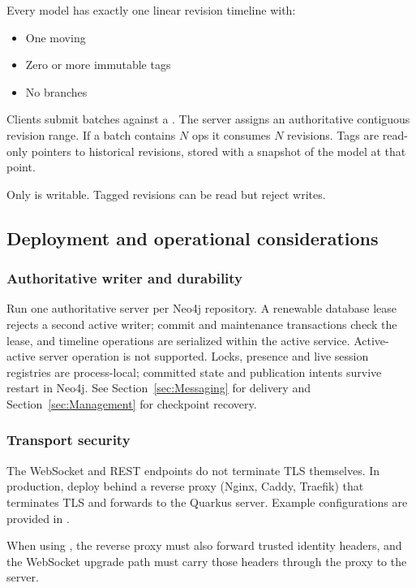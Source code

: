 Every model has exactly one linear revision timeline with:

\begin{itemize}
\item One moving 
\item Zero or more immutable tags
\item No branches
\end{itemize}

Clients submit batches against a . The server assigns an
authoritative contiguous revision range. If a batch contains \(N\) ops it
consumes \(N\) revisions. Tags are read-only pointers to historical revisions,
stored with a snapshot of the model at that point.

Only  is writable. Tagged revisions can be read but reject writes.

\subsection{Deployment and operational considerations}

\subsubsection{Authoritative writer and durability}

Run one authoritative server per Neo4j repository. A renewable database lease
rejects a second active writer; commit and maintenance transactions check the
lease, and timeline operations are serialized within the active service.
Active-active server operation is not supported. Locks, presence and live
session registries are process-local; committed state and publication intents
survive restart in Neo4j. See Section~\ref{sec:Messaging} for delivery and
Section~\ref{sec:Management} for checkpoint recovery.

\subsubsection{Transport security}

The WebSocket and REST endpoints do not terminate TLS themselves. In production,
deploy behind a reverse proxy (Nginx, Caddy, Traefik) that terminates TLS and
forwards to the Quarkus server. Example configurations are provided in
.

When using , the reverse proxy must also
forward trusted identity headers, and the WebSocket upgrade path must carry
those headers through the proxy to the server.

